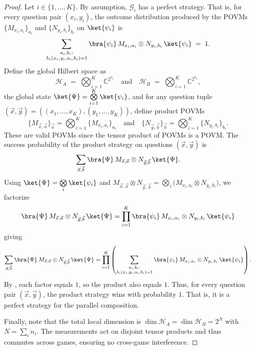 \documentclass{article}
\begin{document}
\begin{proof}
    Let $i\in\{1,\dots,K\}$. By assumption, $\mathcal{G}_i$ has a perfect strategy. That is, for every question pair $(x_i,y_i)$, the outcome distribution produced by the POVMs $\{M_{x_i,a_i}\}_{a_i}$ and $\{N_{y_i,b_i}\}_{b_i}$ on $\ket{\psi_i}$ is
    \begin{equation}\label{eq: win per game}
        \sum_{\substack{a_i,b_i:\\ \lambda_i(x_i,y_i,a_i,b_i)=1 }} \bra{\psi_i}\,M_{x_i,a_i}\otimes N_{y_i,b_i}\,\ket{\psi_i}\;=\;1.
    \end{equation}
    Define the global Hilbert space as
    \begin{equation}     
        \mathcal{H}_A\;=\;\bigotimes_{i=1}^K \mathbb{C}^{2^{n_i}}  \quad\text{and}\quad \mathcal{H}_B\;=\;\bigotimes_{i=1}^K \mathbb{C}^{2^{n_i}},
    \end{equation}
    the global state $\ket{\Psi}=\bigotimes\limits_{i=1}^K \ket{\psi_i}$, and for any question tuple $(\vec{x},\vec{y})=((x_1,\dots,x_K),(y_1,\dots,y_K))$, define product POVMs
    \begin{equation*}
        \{M_{\vec{x},\vec{a}}\}_{\vec{a}}=\bigotimes_{i=1}^K \{M_{x_i,a_i}\}_{a_i} \quad\text{and}\quad \{N_{\vec{y},\vec{b}}\}_{\vec{b}}=\bigotimes_{i=1}^K \{N_{y_i,b_i}\}_{b_i}.
    \end{equation*}
    These are valid POVMs since the tensor product of POVMs is a POVM.
    The success probability of the product strategy on questions $(\vec{x},\vec{y})$ is 
    \begin{equation*}
        \sum_{\vec{a},\vec{b}}\bra{\Psi}\,M_{\vec{x},\vec{a}}\otimes N_{\vec{y},\vec{b}}\,\ket{\Psi}.
    \end{equation*}
    Using $\ket{\Psi}=\bigotimes\limits_i \ket{\psi_i}$ and $M_{\vec{x},\vec{a}}\otimes N_{\vec{y},\vec{b}} =\bigotimes\limits_i \big(M_{x_i,a_i}\otimes N_{y_i,b_i}\big)$, we factorize 
    \begin{equation*}
    \bra{\Psi}\,M_{\vec{x},\vec{a}}\otimes N_{\vec{y},\vec{b}}\,\ket{\Psi} =\prod_{i=1}^K \bra{\psi_i}\,M_{x_i,a_i}\otimes N_{y_i,b_i}\,\ket{\psi_i}
    \end{equation*}
    giving 
    \begin{equation*}
        \sum_{\vec{a},\vec{b}}\bra{\Psi}\,M_{\vec{x},\vec{a}}\otimes N_{\vec{y},\vec{b}}\,\ket{\Psi} =\prod_{i=1}^K \left(  \sum_{\substack{a_i,b_i:\\ \lambda_i(x_i,y_i,a_i,b_i)=1 }} \bra{\psi_i}\,M_{x_i,a_i}\otimes N_{y_i,b_i}\,\ket{\psi_i} \right).
    \end{equation*}
    By , each factor equals $1$, so the product also equals $1$. Thus, for every question pair $(\vec{x},\vec{y})$, the product strategy wins with probability $1$. That is, it is a perfect strategy for the parallel composition. 
    
    Finally, note that the total local dimension is $\dim \mathcal{H}_A=\dim \mathcal{H}_B=2^N$ with $N=\sum_i n_i$. The measurements act on disjoint tensor products and thus commutes across games, ensuring no cross-game interference.
\end{proof}
\end{document}
